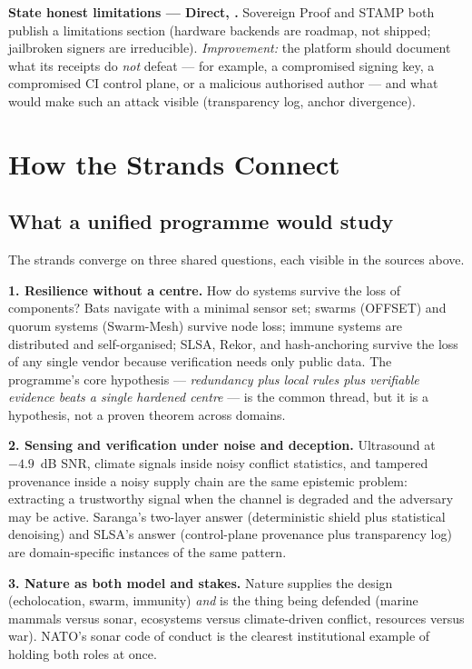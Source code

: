 \documentclass[11pt]{article}
\begin{document}
\textbf{State honest limitations --- Direct,
\cite{sovereign2026,stamp}.} Sovereign Proof and STAMP both publish a
limitations section (hardware backends are roadmap, not shipped;
jailbroken signers are irreducible). \emph{Improvement:} the platform
should document what its receipts do \emph{not} defeat --- for example,
a compromised signing key, a compromised CI control plane, or a
malicious authorised author --- and what would make such an attack
visible (transparency log, anchor divergence).

\section{How the Strands Connect}
\label{sec:connection}

\subsection{What a unified programme would study}

The strands converge on three shared questions, each visible in the
sources above.

\textbf{1. Resilience without a centre.} How do systems survive the
loss of components? Bats navigate with a minimal sensor set; swarms
(OFFSET) and quorum systems (Swarm-Mesh) survive node loss; immune
systems are distributed and self-organised; SLSA, Rekor, and
hash-anchoring survive the loss of any single vendor because
verification needs only public data. The programme's core hypothesis ---
\emph{redundancy plus local rules plus verifiable evidence beats a
single hardened centre} --- is the common thread, but it is a
hypothesis, not a proven theorem across domains.

\textbf{2. Sensing and verification under noise and deception.}
Ultrasound at $-4.9$~dB SNR, climate signals inside noisy conflict
statistics, and tampered provenance inside a noisy supply chain are the
same epistemic problem: extracting a trustworthy signal when the channel
is degraded and the adversary may be active. Saranga's two-layer answer
(deterministic shield plus statistical denoising) and SLSA's answer
(control-plane provenance plus transparency log) are domain-specific
instances of the same pattern.

\textbf{3. Nature as both model and stakes.} Nature supplies the design
(echolocation, swarm, immunity) \emph{and} is the thing being defended
(marine mammals versus sonar, ecosystems versus climate-driven conflict,
resources versus war). NATO's sonar code of conduct is the clearest
institutional example of holding both roles at once.
\end{document}
